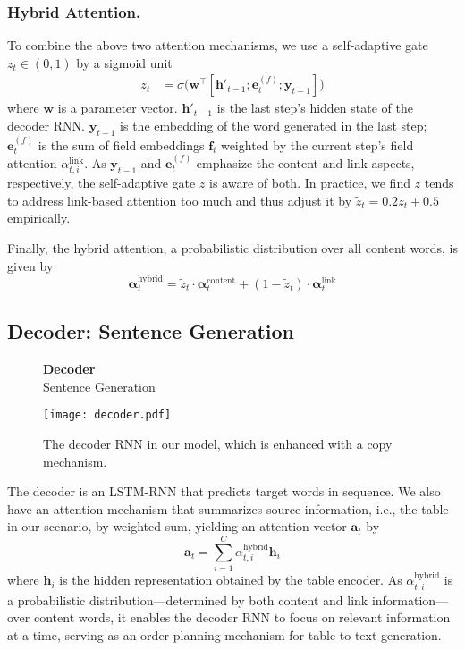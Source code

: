 \documentclass[letterpaper]{article} %
\begin{document}
\subsubsection{Hybrid Attention.}
To combine the above two attention mechanisms, we use a self-adaptive gate $z_t\in(0,1)$ by a sigmoid unit
\begin{align}
z_t &= \sigma\big(\bm w^\top[\bm h'_{t-1}; \bm e_t^{(f)}; \bm y_{t-1} ]\big)
\end{align}
where $\bm w$ is a parameter vector. $\bm h'_{t-1}$ is the last step's hidden state of the decoder RNN. $\bm y_{t-1}$ is the embedding of the word generated in the last step; $\bm e_t^{(f)}$ is the sum of field embeddings $\bm f_i$ weighted by the current step's field attention $\alpha_{t,i}^\text{link}$. As $\bm y_{t-1}$ and $\bm e_t^{(f)}$ emphasize the content and link aspects, respectively, the self-adaptive gate $z$ is aware of both.
In practice, we find $z$ tends to address link-based attention too much and thus adjust it by $\widetilde z_t= 0.2z_t + 0.5$ empirically.

Finally, the hybrid attention, a probabilistic distribution over all content words, is given by
\begin{equation}
 \bm\alpha_t^\text{hybrid} = \widetilde z_t \cdot \bm \alpha_t^\text{content} + (1-\widetilde z_t)\cdot \bm \alpha_t^\text{link}\label{eq:gate}
\end{equation}





\subsection{Decoder: Sentence Generation}

\begin{figure}[!t]
	\begin{center}
		\textbf{Decoder}\\
		Sentence Generation
		
		\smallskip
		
		\texttt{[image: decoder.pdf]}
		\caption{The decoder RNN in our model, which is enhanced with a copy mechanism.}
	\end{center}
\end{figure}

The decoder is an LSTM-RNN that predicts target words in sequence. We also have an attention mechanism \cite{attention} that summarizes source information, i.e., the table in our scenario, by weighted sum, yielding an attention vector $\bm a_t$ by
\begin{equation}
\bm a_t = \sum_{i=1}^C\alpha_{t,i}^\text{hybrid}\bm h_i
\end{equation}
where $\bm h_i$ is the hidden representation obtained by the table encoder. As $\alpha_{t,i}^\text{hybrid}$ is a probabilistic distribution---determined by both content and link information---over content words, it enables the decoder RNN to focus on relevant information at a time, serving as an order-planning mechanism for table-to-text generation.
\end{document}
